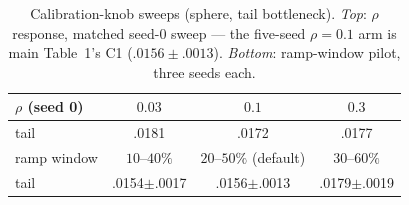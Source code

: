 \begin{table}[t]
\centering
\caption{Calibration-knob sweeps (sphere, tail bottleneck). \emph{Top}:
$\rho$ response, matched seed-0 sweep --- the five-seed $\rho{=}0.1$ arm
is main Table~1's C1 ($.0156{\pm}.0013$). \emph{Bottom}: ramp-window
pilot, three seeds each.}
\label{tab:knobs}
\footnotesize
\setlength{\tabcolsep}{3pt}
\begin{tabular}{lccc}
\toprule
$\rho$ (seed 0) & $0.03$ & $0.1$ & $0.3$ \\
\midrule
tail & .0181 & .0172 & .0177 \\
\midrule
ramp window & $10$--$40\%$ & $20$--$50\%$ (default) & $30$--$60\%$ \\
\midrule
tail & .0154$\pm$.0017 & .0156$\pm$.0013 & .0179$\pm$.0019 \\
\bottomrule
\end{tabular}
\end{table}
